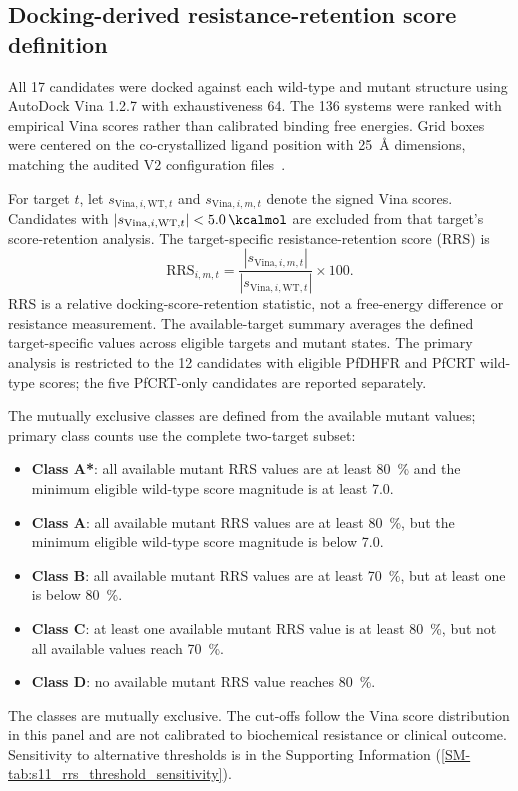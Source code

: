 \documentclass[journal=jcisd8,manuscript=article,layout=traditional]{achemso}
\begin{document}
\subsection{Docking-derived resistance-retention score definition}\label{sec:rrs_formula}

All 17 candidates were docked against each wild-type and mutant structure using AutoDock Vina 1.2.7 with exhaustiveness \num{64}. The 136 systems were ranked with empirical Vina scores rather than calibrated binding free energies. Grid boxes were centered on the co-crystallized ligand position with \qty{25}{\angstrom} dimensions, matching the audited V2 configuration files~\citep{Temgoua2026}.

For target $t$, let $s_{\mathrm{Vina},i,\mathrm{WT},t}$ and $s_{\mathrm{Vina},i,m,t}$ denote the signed Vina scores. Candidates with $|s_{\mathrm{Vina},i,\mathrm{WT},t}| < \qty{5.0}{\kcalmol}$ are excluded from that target's score-retention analysis. The target-specific resistance-retention score (RRS) is
\begin{equation}
\mathrm{RRS}_{i,m,t} = \frac{|s_{\mathrm{Vina},i,m,t}|}{|s_{\mathrm{Vina},i,\mathrm{WT},t}|} \times 100.
\end{equation}
RRS is a relative docking-score-retention statistic, not a free-energy difference or resistance measurement. The available-target summary averages the defined target-specific values across eligible targets and mutant states. The primary analysis is restricted to the 12 candidates with eligible PfDHFR and PfCRT wild-type scores; the five PfCRT-only candidates are reported separately.

The mutually exclusive classes are defined from the available mutant values; primary class counts use the complete two-target subset:
\begin{itemize}
    \item \textbf{Class A*}: all available mutant RRS values are at least \qty{80}{\percent} and the minimum eligible wild-type score magnitude is at least \qty{7.0}{\kcalmol}.
    \item \textbf{Class A}: all available mutant RRS values are at least \qty{80}{\percent}, but the minimum eligible wild-type score magnitude is below \qty{7.0}{\kcalmol}.
    \item \textbf{Class B}: all available mutant RRS values are at least \qty{70}{\percent}, but at least one is below \qty{80}{\percent}.
    \item \textbf{Class C}: at least one available mutant RRS value is at least \qty{80}{\percent}, but not all available values reach \qty{70}{\percent}.
    \item \textbf{Class D}: no available mutant RRS value reaches \qty{80}{\percent}.
\end{itemize}
The classes are mutually exclusive. The cut-offs follow the Vina score distribution in this panel and are not calibrated to biochemical resistance or clinical outcome. Sensitivity to alternative thresholds is in the Supporting Information (\cref{SM-tab:s11_rrs_threshold_sensitivity}).
\end{document}
